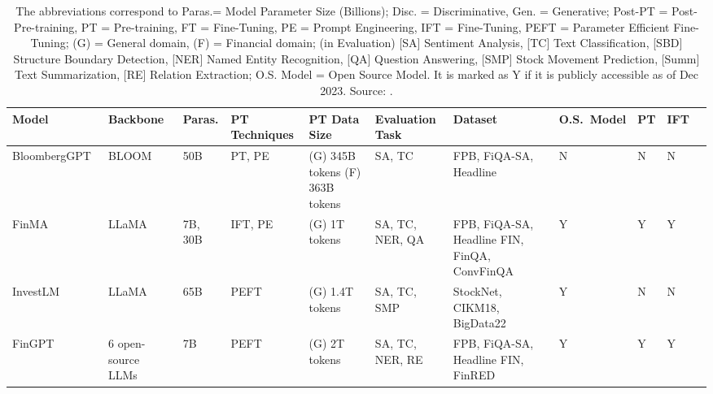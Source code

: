 \begin{table}[!h]
	\scriptsize
	\centering
	\begin{tabularx}{\textwidth}{@{}lp{1.5cm}p{1cm}p{1cm}p{1.5cm}p{1.5cm}p{1.5cm}p{1cm}p{1cm}p{1cm}p{1cm}@{}}
		\toprule
		Model                                  & Backbone           & Paras.  & PT Techniques & PT \newline Data Size                    & Evaluation \newline Task & Dataset                                               & O.S.\ Model & PT & IFT \\
		\midrule
		BloombergGPT~\cite{wu2023bloomberggpt} & BLOOM              & 50B     & PT, PE        & (G) 345B tokens \newline (F) 363B tokens & SA, TC                   & FPB, FiQA-SA, Headline                                & N           & N  & N   \\
		FinMA~\cite{xie2023pixiu}              & LLaMA              & 7B, 30B & IFT, PE       & (G) 1T tokens                            & SA, TC, NER, QA          & FPB, FiQA-SA, Headline \newline FIN, FinQA, ConvFinQA & Y           & Y  & Y   \\
		InvestLM~\cite{yang2023investlm}       & LLaMA              & 65B     & PEFT          & (G) 1.4T tokens                          & SA, TC, SMP              & StockNet, CIKM18, BigData22                           & Y           & N  & N   \\
		FinGPT~\cite{wang2023fingpt}           & 6 open-source LLMs & 7B      & PEFT          & (G) 2T tokens                            & SA, TC, NER, RE          & FPB, FiQA-SA, Headline \newline FIN, FinRED           & Y           & Y  & Y   \\
		\bottomrule
	\end{tabularx}
	\caption{The abbreviations correspond to Paras.= Model Parameter Size (Billions); Disc. = Discriminative, Gen. = Generative; Post-PT = Post-Pre-training, PT = Pre-training, FT = Fine-Tuning, PE = Prompt Engineering, IFT = Fine-Tuning, PEFT = Parameter Efficient Fine-Tuning; (G) = General domain, (F) = Financial domain; (in Evaluation) [SA] Sentiment Analysis, [TC] Text Classification, [SBD] Structure Boundary Detection, [NER] Named Entity Recognition, [QA] Question Answering, [SMP] Stock Movement Prediction, [Summ] Text Summarization, [RE] Relation Extraction; O.S. Model = Open Source Model. It is marked as Y if it is publicly accessible as of Dec 2023. Source: \textcite{lee2024survey}.}
	\label{tab:fin_llms}
\end{table}


